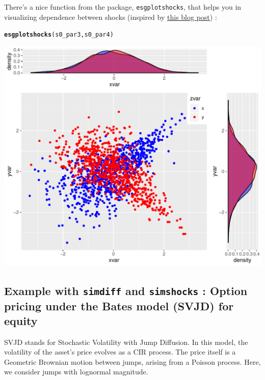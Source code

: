 \documentclass[a4paper]{article}\usepackage[]{graphicx}\usepackage[]{color}
\makeatletter
\def\maxwidth{ %
  \ifdim\Gin@nat@width>\linewidth
    \linewidth
  \else
    \Gin@nat@width
  \fi
}
\newcommand{\hlstd}[1]{\textcolor[rgb]{0.345,0.345,0.345}{#1}}%
\newcommand{\hlkwd}[1]{\textcolor[rgb]{0.737,0.353,0.396}{\textbf{#1}}}%
\newenvironment{kframe}{%
 \def\at@end@of@kframe{}%
 \ifinner\ifhmode%
  \def\at@end@of@kframe{\end{minipage}}%
  \begin{minipage}{\columnwidth}%
 \fi\fi%
 \def\FrameCommand##1{\hskip\@totalleftmargin \hskip-\fboxsep
 \colorbox{shadecolor}{##1}\hskip-\fboxsep
     \hskip-\linewidth \hskip-\@totalleftmargin \hskip\columnwidth}%
 \MakeFramed {\advance\hsize-\width
   \@totalleftmargin\z@ \linewidth\hsize
   \@setminipage}}%
 {\par\unskip\endMakeFramed%
 \at@end@of@kframe}
\newenvironment{knitrout}{}{} %
\newcommand{\code}[1]{\mbox{\texttt{#1}}}
\makeatother
\begin{document}
There's a nice function from the package, \code{esgplotshocks}, that helps you in visualizing  dependence between shocks (inspired by \href{http://rforpublichealth.blogspot.fr/2014/02/ggplot2-cheatsheet-for-visualizing.html}{this blog post}) : 

\begin{knitrout}
\color{fgcolor}\begin{kframe}
\begin{alltt}
\hlkwd{esgplotshocks}\hlstd{(s0_par3, s0_par4)}
\end{alltt}
\end{kframe}

{\centering \includegraphics[width=\maxwidth]{figure/example_simshocks_5-1} 

}



\end{knitrout}

\newpage

\subsection{Example with \code{simdiff} and \code{simshocks} : Option pricing under the  Bates model (SVJD) for equity}
\label{sec:examplesimulation}

SVJD stands for Stochastic Volatility with Jump Diffusion. In this model, the volatility of the asset's price evolves as a CIR process. The price itself is a Geometric Brownian motion between jumps, arising from a Poisson process. Here, we consider jumps with lognormal magnitude.  
\end{document}
